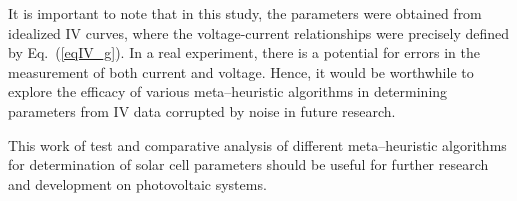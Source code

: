 \documentclass[a4paper,fleqn]{cas-dc}
\begin{document}
It is important to note that in this study, 
the parameters were obtained from idealized IV curves, 
where the voltage-current relationships were precisely defined by Eq.~(\ref{eqIV_g}).
In a real experiment, there is a potential for errors in the measurement of both current and voltage.
Hence,  it would be worthwhile to explore the efficacy of various meta--heuristic algorithms
in determining parameters from IV data corrupted by noise in future research.

This work of test and comparative analysis of
different meta--heuristic algorithms  for determination 
of solar cell parameters should be useful for further research and development on photovoltaic systems.



%


\end{document}
